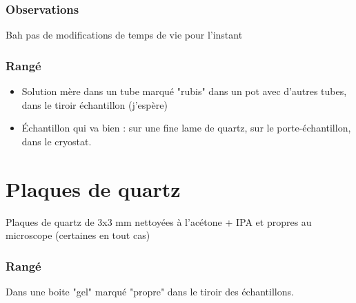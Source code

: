 \documentclass[a4paper]{report}
\begin{document}
 \subsubsection{Observations}
 Bah pas de modifications de temps de vie pour l'instant
 \subsubsection{Rangé}
 \begin{itemize}
 \item Solution mère dans un tube marqué "rubis" dans un pot avec d'autres tubes, dans le tiroir échantillon (j'espère)
 \item Échantillon qui va bien : sur une fine lame de quartz, sur le porte-échantillon, dans le cryostat.
 \end{itemize}
 
 
 
 \section{Plaques de quartz}
 Plaques de quartz de 3x3 mm nettoyées à l'acétone + IPA et propres au microscope (certaines en tout cas)
 \subsubsection{Rangé}
 Dans une boite "gel" marqué "propre" dans le tiroir des échantillons.
  
\end{document}

